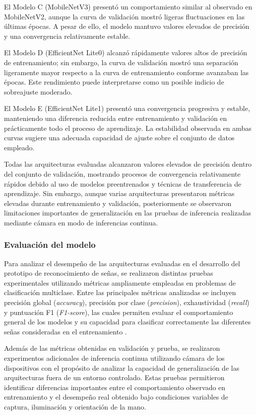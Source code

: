 	El Modelo C (MobileNetV3) presentó un comportamiento similar al observado en MobileNetV2, aunque la curva de validación mostró ligeras fluctuaciones en las últimas épocas. A pesar de ello, el modelo mantuvo valores elevados de precisión y una convergencia relativamente estable.
	
	El Modelo D (EfficientNet Lite0) alcanzó rápidamente valores altos de precisión de entrenamiento; sin embargo, la curva de validación mostró una separación ligeramente mayor respecto a la curva de entrenamiento conforme avanzaban las épocas. Este rendimiento puede interpretarse como un posible indicio de sobreajuste moderado.
	
	El Modelo E (EfficientNet Lite1) presentó una convergencia progresiva y estable, manteniendo una diferencia reducida entre entrenamiento y validación en prácticamente todo el proceso de aprendizaje. La estabilidad observada en ambas curvas sugiere una adecuada capacidad de ajuste sobre el conjunto de datos empleado.
	
	Todas las arquitecturas evaluadas alcanzaron valores elevados de precisión dentro del conjunto de validación, mostrando procesos de convergencia relativamente rápidos debido al uso de modelos preentrenados y técnicas de transferencia de aprendizaje. Sin embargo, aunque varias arquitecturas presentaron métricas elevadas durante entrenamiento y validación, posteriormente se observaron limitaciones importantes de generalización en las pruebas de inferencia realizadas mediante cámara en modo de inferencias continua.
	
	\subsubsection{Evaluación del modelo}
	
	Para analizar el desempeño de las arquitecturas evaluadas en el desarrollo del prototipo de reconocimiento de señas, se realizaron distintas pruebas experimentales utilizando métricas ampliamente empleadas en problemas de clasificación multiclase. Entre las principales métricas analizadas se incluyen precisión global (\textit{accuracy}), precisión por clase (\textit{precision}), exhaustividad (\textit{recall}) y puntuación F1 (\textit{F1-score}), las cuales permiten evaluar el comportamiento general de los modelos y su capacidad para clasificar correctamente las diferentes señas consideradas en el entrenamiento \cite{goodfellow2016deep,geron2022hands}.
	
	Además de las métricas obtenidas en validación y prueba, se realizaron experimentos adicionales de inferencia continua utilizando cámara de los dispositivos con el propósito de analizar la capacidad de generalización de las arquitecturas fuera de un entorno controlado. Estas pruebas permitieron identificar diferencias importantes entre el comportamiento observado en entrenamiento y el desempeño real obtenido bajo condiciones variables de captura, iluminación y orientación de la mano.
	
